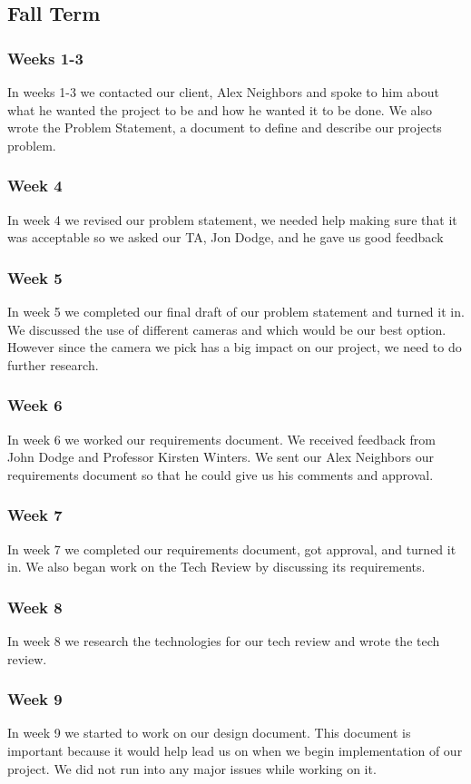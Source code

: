 \documentclass[onecolumn, draftclsnofoot,10pt, compsoc]{IEEEtran}
\begin{document}
\subsection{Fall Term}

\subsubsection{Weeks 1-3}
In weeks 1-3 we contacted our client, Alex Neighbors and spoke to him about what he wanted the project to be and how he wanted it to be done.
We also wrote the Problem Statement, a document to define and describe our projects problem.
\subsubsection{Week 4}
In week 4 we revised our problem statement, we needed help making sure that it was acceptable so we asked our TA, Jon Dodge, and he gave us good feedback 
\subsubsection{Week 5}
In week 5 we completed our final draft of our problem statement and turned it in.
We discussed the use of different cameras and which would be our best option.
However since the camera we pick has a big impact on our project, we need to do further research.
\subsubsection{Week 6}
In week 6 we worked our requirements document.
We received feedback from John Dodge and Professor Kirsten Winters.
We sent our Alex Neighbors our requirements document so that he could give us his comments and approval.
\subsubsection{Week 7}
In week 7 we completed our requirements document, got approval, and turned it in.
We also began work on the Tech Review by discussing its requirements.
\subsubsection{Week 8}
In week 8 we research the technologies for our tech review and wrote the tech review.
\subsubsection{Week 9}
In week 9 we started to work on our design document.
This document is important because it would help lead us on when we begin implementation of our project.
We did not run into any major issues while working on it.
\end{document}
